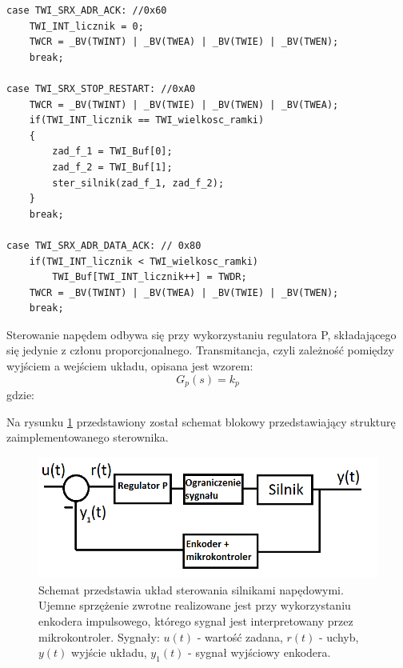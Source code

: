 \begin{lstlisting}
case TWI_SRX_ADR_ACK: //0x60
	TWI_INT_licznik = 0;
	TWCR = _BV(TWINT) | _BV(TWEA) | _BV(TWIE) | _BV(TWEN);
	break;
	
case TWI_SRX_STOP_RESTART: //0xA0
	TWCR = _BV(TWINT) | _BV(TWIE) | _BV(TWEN) | _BV(TWEA);
	if(TWI_INT_licznik == TWI_wielkosc_ramki)
	{
		zad_f_1 = TWI_Buf[0];
		zad_f_2 = TWI_Buf[1];
		ster_silnik(zad_f_1, zad_f_2);
	}
	break;

case TWI_SRX_ADR_DATA_ACK: // 0x80
	if(TWI_INT_licznik < TWI_wielkosc_ramki)
		TWI_Buf[TWI_INT_licznik++] = TWDR;
	TWCR = _BV(TWINT) | _BV(TWEA) | _BV(TWIE) | _BV(TWEN);
	break;
\end{lstlisting}

Sterowanie napędem odbywa się przy wykorzystaniu regulatora P, składającego się jedynie z członu proporcjonalnego. Transmitancja, czyli zależność pomiędzy wyjściem a wejściem układu, opisana jest wzorem:
\begin{equation}
	G_{p}(s) =  k_p 
   \label{eq:reg}
 \end{equation}
 gdzie:  
 \begin{equationDescriptor}
 \end{equationDescriptor}
 \noindent
 Na rysunku \ref{schem_ster_2} przedstawiony został schemat blokowy przedstawiający strukturę zaimplementowanego sterownika.
   \begin{figure}[H]
    \begin{center}
      \includegraphics[scale=0.45]{imgs/sterowanie2.png}
 	\caption[Schemat zrealizowanego sterownika.]{\small{Schemat przedstawia układ sterowania silnikami napędowymi. Ujemne sprzężenie zwrotne realizowane jest przy wykorzystaniu enkodera impulsowego, którego sygnał jest interpretowany przez mikrokontroler. Sygnały: $u(t)$ - wartość zadana, $r(t)$ - uchyb, $y(t)$ wyjście układu, $y_1(t)$ - sygnał wyjściowy enkodera.}}
	\label{schem_ster_2}
    \end{center}
  \end{figure}  
